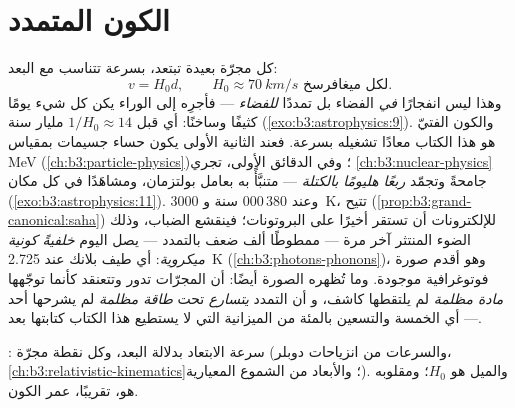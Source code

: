 \section{الكون المتمدد}

\begin{definition}\label{def:b3:astrophysics:hubble}
كل مجرّة بعيدة تبتعد، بسرعة تتناسب مع البعد:
\[
v = H_0d , \qquad H_0 \approx \qty{70}{km/s}
\text{ لكل ميغافرسخ} .
\]
وهذا ليس انفجارًا \emph{في} الفضاء بل تمددًا
\emph{للفضاء} --- فأجرِه إلى الوراء يكن كل شيء يومًا
كثيفًا وساخنًا: أي قبل $1/H_0 \approx 14$ مليار سنة
(\cref{exo:b3:astrophysics:9}). والكون الفتيّ هو هذا الكتاب
معادًا تشغيله بسرعة. فعند الثانية الأولى يكون حساء جسيمات بمقياس \unit{MeV}
(\cref{ch:b3:particle-physics})؛ وفي الدقائق الأولى، تجري
\cref{ch:b3:nuclear-physics} جامحةً وتجمّد
\emph{ربعًا هليومًا بالكتلة} --- متنبَّأً به بعامل
بولتزمان، ومشاهَدًا في كل مكان
(\cref{exo:b3:astrophysics:11}). وعند 380\,000 سنة و
\qty{3000}{K}، تتيح 
(\cref{prop:b3:grand-canonical:saha}) للإلكترونات أن تستقر أخيرًا
على البروتونات؛ فينقشع الضباب، وذلك الضوء المنتثر آخر مرة ---
ممطوطًا ألف ضعف بالتمدد --- يصل اليوم
\emph{خلفيةً كونية ميكروية}: أي طيف بلانك عند \qty{2.725}{K}
(\cref{ch:b3:photons-phonons})، وهو أقدم صورة
فوتوغرافية موجودة. وما تُظهره الصورة أيضًا: أن المجرّات تدور وتتعنقد
كأنما توجّهها \emph{مادة مظلمة} لم يلتقطها كاشف، و
أن التمدد \emph{يتسارع} تحت \emph{طاقة مظلمة}
لم يشرحها أحد --- أي الخمسة والتسعين بالمئة من الميزانية
التي لا يستطيع هذا الكتاب كتابتها بعد.
\end{definition}

\begin{omfigure}

{\small {}: سرعة الابتعاد بدلالة البعد، وكل نقطة
مجرّة (والسرعات من انزياحات دوبلر،
\cref{ch:b3:relativistic-kinematics}؛ والأبعاد من الشموع
المعيارية). والميل هو $H_0$؛ ومقلوبه هو، تقريبًا، عمر
الكون.}
\end{omfigure}

